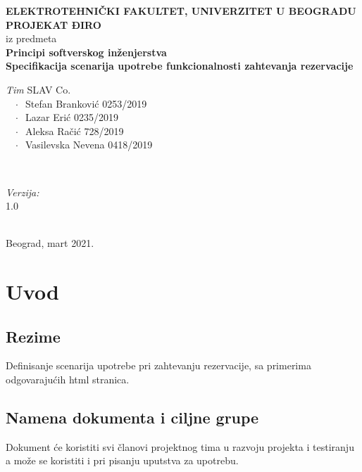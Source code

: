 \documentclass[12pt]{article}
\begin{document}
    \renewcommand{\labelenumii}{\arabic{enumi}.\arabic{enumii}}
	\begin{titlepage}  
		\center
		\textbf{ \LARGE ELEKTROTEHNIČKI FAKULTET, UNIVERZITET U BEOGRADU } \\[4cm]
		\textbf{ \Large PROJEKAT ĐIRO\texttrademark} \\[0.3cm]
		iz predmeta \\[0.3cm]
		\textbf{ \Large Principi softverskog inženjerstva} \\[0.7cm]
		{ \huge \bfseries Specifikacija scenarija upotrebe funkcionalnosti zahtevanja rezervacije } \\[6cm]
		

		\begin{minipage}{0.5\textwidth}
			\begin{flushleft}
				\large
				\emph{Tim} SLAV Co. \\
			     $\;\;\; \cdot \;\;$Stefan Branković  0253/2019\\
			     $\;\;\; \cdot \;\;$Lazar Erić 0235/2019\\
			     $\;\;\; \cdot \;\;$Aleksa Račić 728/2019\\
			     $\;\;\; \cdot \;\;$Vasilevska Nevena 0418/2019
			\end{flushleft}
		\end{minipage}
		~
		\begin{minipage}{0.4\textwidth}
			\begin{flushright}
				\large
				\emph{Verzija:} \\
				1.0
			\end{flushright}
		\end{minipage} \\[2cm]
		\enlargethispage{4\baselineskip}
		{ \large Beograd, mart 2021. }
		\vfill
	\end{titlepage}
\pagebreak
\tableofcontents
\pagebreak



\section{Uvod}
\subsection{Rezime}
Definisanje scenarija upotrebe pri zahtevanju rezervacije, sa primerima odgovarajućih html stranica.
\subsection{Namena dokumenta i ciljne grupe}
Dokument će koristiti svi članovi projektnog tima u razvoju projekta i testiranju a može se koristiti i pri pisanju uputstva za
upotrebu.
\end{document}
